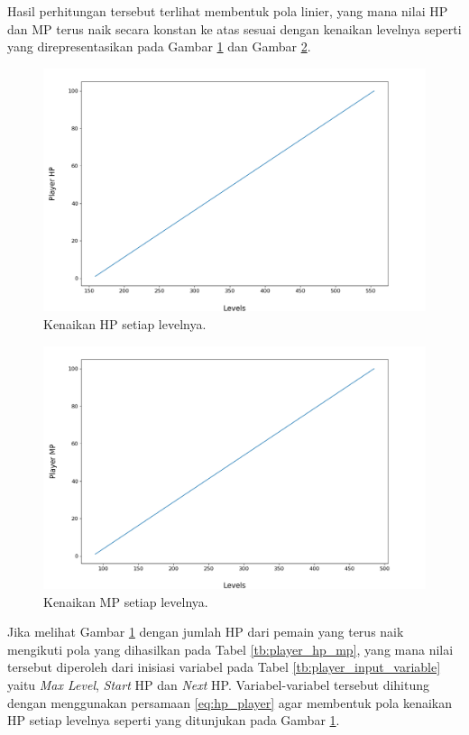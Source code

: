 Hasil perhitungan tersebut terlihat membentuk pola linier, yang mana nilai HP dan MP terus naik secara konstan ke atas sesuai dengan kenaikan levelnya seperti yang direpresentasikan pada Gambar \ref{fig:hp_player} dan Gambar \ref{fig:mp_player}.

\begin{figure} [!h] \centering
	\includegraphics[scale=0.5]{img/PlayerHpDistrib.png}
	\caption{Kenaikan HP setiap levelnya.}
	\vspace{1ex}
	\label{fig:hp_player}
\end{figure}
\vspace{3ex}

\begin{figure} [!h] \centering
	\includegraphics[scale=0.5]{img/PlayerMpDistrib.png}
	\caption{Kenaikan MP setiap levelnya.}
	\label{fig:mp_player}
\end{figure}

Jika melihat Gambar \ref{fig:hp_player} dengan jumlah HP dari pemain yang terus naik mengikuti pola yang dihasilkan pada Tabel \ref{tb:player_hp_mp}, yang mana nilai tersebut diperoleh dari inisiasi variabel pada Tabel \ref{tb:player_input_variable} yaitu \textit{Max Level}, \textit{Start} HP dan \textit{Next} HP. Variabel-variabel tersebut dihitung dengan menggunakan persamaan \ref{eq:hp_player} agar membentuk pola kenaikan HP setiap levelnya seperti yang ditunjukan pada Gambar \ref{fig:hp_player}.
\vspace{1ex}

